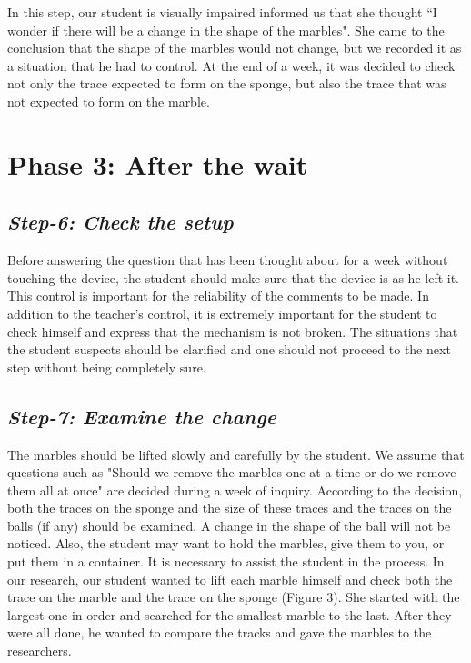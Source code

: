 \documentclass[11.5pt]{sig-alternate}
\begin{document}
\begin{large}
In this step, our student is visually impaired informed us that she thought ``I wonder if there will be a change in the shape of the marbles". She came to the conclusion that the shape of the marbles would not change, but we recorded it as a situation that he had to control. At the end of a week, it was decided to check not only the trace expected to form on the sponge, but also the trace that was not expected to form on the marble.
 
\section*{Phase 3: After the wait}

\subsection*{\textit{Step-6: Check the setup}}
Before answering the question that has been thought about for a week without touching the device, the student should make sure that the device is as he left it. This control is important for the reliability of the comments to be made. In addition to the teacher's control, it is extremely important for the student to check himself and express that the mechanism is not broken. The situations that the student suspects should be clarified and one should not proceed to the next step without being completely sure. 

\subsection*{\textit{Step-7: Examine the change}}
The marbles should be lifted slowly and carefully by the student. We assume that questions such as "Should we remove the marbles one at a time or do we remove them all at once" are decided during a week of inquiry. According to the decision, both the traces on the sponge and the size of these traces and the traces on the balls (if any) should be examined. A change in the shape of the ball will not be noticed. Also, the student may want to hold the marbles, give them to you, or put them in a container. It is necessary to assist the student in the process. In our research, our student wanted to lift each marble himself and check both the trace on the marble and the trace on the sponge (Figure 3). She started with the largest one in order and searched for the smallest marble to the last. After they were all done, he wanted to compare the tracks and gave the marbles to the researchers.


\end{large}
\end{document}
